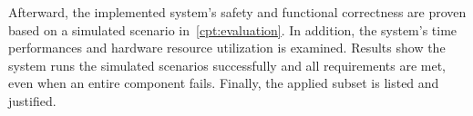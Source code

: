 \noindent 
Afterward, the implemented system's safety and functional correctness are proven based on a simulated  scenario in~\autoref{cpt:evaluation}.
In addition, the system's time performances and hardware resource utilization is examined.
Results show the system runs the simulated scenarios successfully and all requirements are met, even when an entire component fails.
Finally, the applied  subset is listed and justified.



